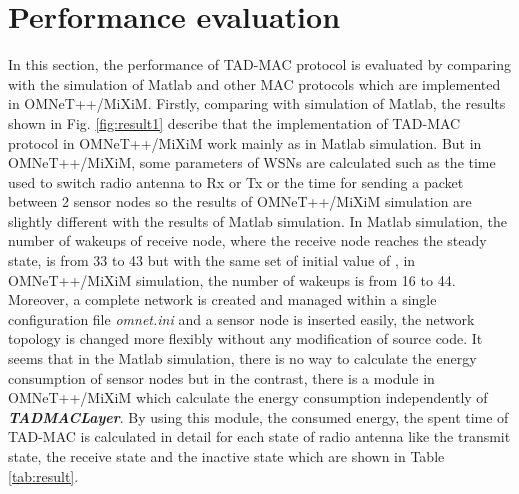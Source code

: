 \documentclass[conference]{IEEEtran}
\begin{document}
\section{Performance evaluation}
In this section, the performance of TAD-MAC protocol is evaluated by comparing with the simulation of Matlab and other MAC protocols which are implemented in OMNeT++/MiXiM. Firstly, comparing with simulation of Matlab, the results shown in Fig. \ref{fig:result1} describe that the implementation of TAD-MAC protocol in OMNeT++/MiXiM work mainly as in Matlab simulation. But in OMNeT++/MiXiM, some parameters of WSNs are calculated such as the time used to switch radio antenna to Rx or Tx or the time for sending a packet between 2 sensor nodes so the results of OMNeT++/MiXiM simulation are slightly different with the results of Matlab simulation. In Matlab simulation, the number of wakeups of receive node, where the receive node reaches the steady state, is from 33 to 43 but with the same set of initial value of \textit{}, in OMNeT++/MiXiM simulation, the number of wakeups is from 16 to 44. Moreover, a complete network is created and managed within a single configuration file \textit{omnet.ini} and a sensor node is inserted easily, the network topology is changed more flexibly without any modification of source code. It seems that in the Matlab simulation, there is no way to calculate the energy consumption of sensor nodes but in the contrast, there is a module in OMNeT++/MiXiM which calculate the energy consumption independently of \textit{\textbf{TADMACLayer}}. By using this module, the consumed energy, the spent time of TAD-MAC is calculated in detail for each state of radio antenna like the transmit state, the receive state and the inactive state which are shown in Table \ref{tab:result}.
\begin{figure*}[t]
\centerline{
}
\caption{Behavior of  adaptation for number of different initial .}
\label{fig:result1}
\end{figure*}
\end{document}
